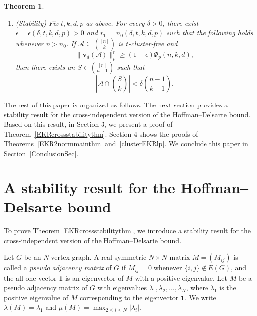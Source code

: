 \documentclass[10pt,a4paper]{amsart}
\numberwithin{equation}{section}
\newtheorem{theorem}{Theorem}[section]
\def\A{\mathcal{A}}
\def\v{\mathbf{v}}
\begin{document}
\begin{theorem}
\begin{enumerate}[label={\rm (\alph*)}]
\begin{enumerate}[label={\rm (\roman*)}]
\item Suppose that $1\leq d\leq k-1$ and $p>2$.  Equality holds
if and only if $\A$ is a star.
\end{enumerate}

\item {\rm(Stability)} Fix $t,k,d,p$ as above.  For every
$\delta>0$, there exist
$\epsilon=\epsilon(\delta,t,k,d,p)>0$ and
$n_0=n_0(\delta,t,k,d,p)$ such that the following holds whenever
$n>n_0$.  If $\A\subseteq\binom{[n]}k$ is $t$-cluster-free and
\[
\|\v_d(\A)\|_p^p\geq
(1-\epsilon)\Phi_p(n,k,d),
\]
then there exists an $S\in\binom{[n]}{n-1}$ such that
\[
\left|\A\cap\binom Sk\right|
<\delta\binom{n-1}{k-1}.
\]
\end{enumerate}
\end{theorem}









The rest of this paper is organized as follows.
The next section provides a stability result for the cross-independent version of the Hoffman--Delsarte bound.
Based on this result, in Section 3, we present a proof of Theorem~\ref{EKRcrossstabilitythm}.
Section 4 shows the proofs of Theorems~\ref{EKR2normmainthm} and~\ref{clusterEKRlp}.
We conclude this paper in Section~\ref{ConclusionSec}.






\section{A stability result for the Hoffman--Delsarte bound}

To prove Theorem \ref{EKRcrossstabilitythm}, we introduce
a stability result for the cross-independent version of the Hoffman--Delsarte bound.




Let $G$ be an $N$-vertex graph.
A real symmetric $N\times N$ matrix $M=(M_{ij})$ is called a {\em pseudo adjacency matrix} of $G$ if $M_{ij}= 0$ whenever $\{i, j\}\notin E(G)$,
and the all-one vector $\mathbf{1}$ is an eigenvector of $M$ with a positive eigenvalue.
Let $M$ be a pseudo adjacency matrix of $G$
with eigenvalues $\lambda_1, \lambda_2, \ldots , \lambda_N$,
where $\lambda_1$ is the positive eigenvalue of $M$
corresponding to the eigenvector $\mathbf{1}$.
We write $\lambda(M)=\lambda_1$ and  $\mu (M)=\max_{2\leq i\leq N} |\lambda_i|$.
\end{document}
